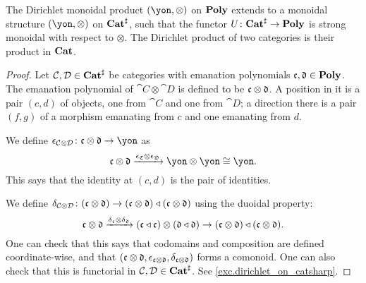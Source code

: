 \documentclass[Book-Poly]{subfiles}
\begin{document}
\begin{proposition}\label{prop.dirichlet_on_catsharp}
The Dirichlet monoidal product $(\yon,\otimes)$ on $\mathbf{Poly}$ extends to a monoidal structure $(\yon,\otimes)$ on $\mathbf{Cat}^\sharp$, such that the functor
$U\colon\mathbf{Cat}^\sharp\to\mathbf{Poly}$
is strong monoidal with respect to $\otimes$. The Dirichlet product of two categories is their product in $\mathbf{Cat}$.
\end{proposition}
\begin{proof}
Let $\mathcal{C},\mathcal{D}\in\mathbf{Cat}^\sharp$ be categories with emanation polynomials $\mathfrak{c},\mathfrak{d}\in\mathbf{Poly}$. The emanation polynomial of $\cat{C}\otimes\cat{D}$ is defined to be $\mathfrak{c}\otimes\mathfrak{d}$. A position in it is a pair $(c,d)$ of objects, one from $\cat{C}$ and one from $\cat{D}$; a direction there is a pair $(f,g)$ of a morphism emanating from $c$ and one emanating from $d$. 

We define $\epsilon_{\cat{C}\otimes\cat{D}}\colon\ema{c}\otimes\ema{d}\to\yon$ as
\[
\ema{c}\otimes\ema{d}\To{\epsilon_{\ema{C}}\otimes\epsilon_{\ema{D}}}\yon\otimes\yon\cong\yon.
\]
This says that the identity at $(c,d)$ is the pair of identities.

We define $\delta_{\mathcal{C}\otimes\mathcal{D}}\colon(\mathfrak{c}\otimes\mathfrak{d})\to(\mathfrak{c}\otimes\mathfrak{d})\mathbin{\triangleleft}(\mathfrak{c}\otimes\mathfrak{d})$ using the duoidal property:
\[
\mathfrak{c}\otimes\mathfrak{d}\xrightarrow{\delta_{\mathfrak{c}}\otimes\delta_{\mathfrak{d}}}(\mathfrak{c}\mathbin{\triangleleft}\mathfrak{c})\otimes(\mathfrak{d}\mathbin{\triangleleft}\mathfrak{d})\to(\mathfrak{c}\otimes\mathfrak{d})\mathbin{\triangleleft}(\mathfrak{c}\otimes\mathfrak{d}).
\]
One can check that this says that codomains and composition are defined coordinate-wise, and that $(\mathfrak{c}\otimes\mathfrak{d},\epsilon_{\mathfrak{c}\otimes\mathfrak{d}},\delta_{\mathfrak{c}\otimes\mathfrak{d}})$ forms a comonoid. One can also check that this is functorial in $\mathcal{C},\mathcal{D}\in\mathbf{Cat}^\sharp$. See \cref{exc.dirichlet_on_catsharp}.
\end{proof}
\end{document}
